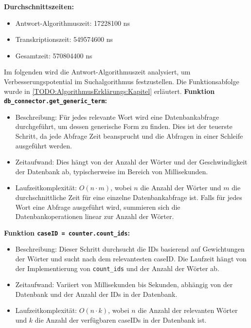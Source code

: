 \textbf{Durchschnittszeiten:}
\begin{itemize}
    \item Antwort-Algorithmuszeit: 17228100 ns
    \item Transkriptionszeit: 549574600 ns
    \item Gesamtzeit: 570804400 ns
\end{itemize}
Im folgenden wird die Antwort-Algorithmuszeit analysiert, um Verbesserungspotential im Suchalgorithmus festzustellen. 
Die Funktionsabfolge wurde in \ref{TODO:AlgorithmusErklärungs:Kapitel} erläutert. 
\textbf{Funktion \lstinline|db_connector.get_generic_term|:}
\begin{itemize}
    \item Beschreibung: Für jedes relevante Wort wird eine Datenbankabfrage durchgeführt, um dessen generische Form zu finden. Dies ist der teuerste Schritt, da jede Abfrage Zeit beansprucht und die Abfragen in einer Schleife ausgeführt werden.
    \item Zeitaufwand: Dies hängt von der Anzahl der Wörter und der Geschwindigkeit der Datenbank ab, typischerweise im Bereich von Millisekunden.
    \item Laufzeitkomplexität: \( O(n \cdot m) \), wobei \( n \) die Anzahl der Wörter und \( m \) die durchschnittliche Zeit für eine einzelne Datenbankabfrage ist. Falls für jedes Wort eine Abfrage ausgeführt wird, summieren sich die Datenbankoperationen linear zur Anzahl der Wörter.
\end{itemize}


\textbf{Funktion \lstinline|caseID = counter.count_ids|:}
\begin{itemize}
    \item Beschreibung: Dieser Schritt durchsucht die IDs basierend auf Gewichtungen der Wörter und sucht nach dem relevantesten caseID. Die Laufzeit hängt von der Implementierung von \lstinline|count_ids| und der Anzahl der Wörter ab.
    \item Zeitaufwand: Variiert von Millisekunden bis Sekunden, abhängig von der Datenbank und der Anzahl der IDs in der Datenbank.
    \item Laufzeitkomplexität: \( O(n \cdot k) \), wobei \( n \) die Anzahl der relevanten Wörter und \( k \) die Anzahl der verfügbaren caseIDs in der Datenbank ist. 
\end{itemize}

